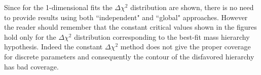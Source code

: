 Since for the 1-dimensional fits the $\Delta \chi^2$ distribution are shown,
there is no need to provide results using both ``independent" and ``global" approaches.
However the reader should remember that the constant critical values 
shown in the figures hold only for the $\Delta \chi^2$ distribution corresponding to the best-fit mass hierarchy hypothesis.
Indeed the constant $\Delta \chi^2$ method does not give the proper coverage for discrete parameters
and consequently the contour of the disfavored hierarchy has bad coverage.





%
%
%


\newpage












